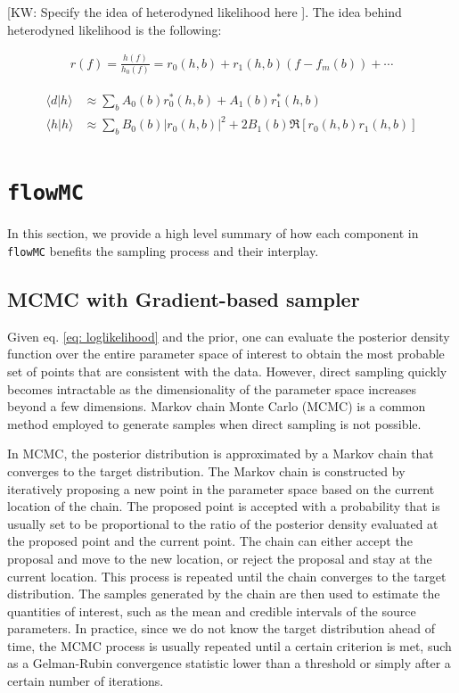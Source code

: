 \documentclass[twocolumn]{aastex631}
\newcommand{\kw}[1]{{\color{rb4}[KW: #1 ]}}
\begin{document}
\kw{Specify the idea of heterodyned likelihood here}.
The idea behind heterodyned likelihood is the following:


\begin{align}
r(f) = \frac{h(f)}{h_0(f)} = r_0(h,b) + r_1(h,b)(f- f_m(b)) + \cdots
\end{align}

\begin{align}
    \langle d|h \rangle &\approx \sum_b A_0(b) r^*_0(h,b) + A_1(b) r^*_1(h,b) \nonumber \\
    \langle h|h \rangle &\approx \sum_b B_0(b) |r_0(h,b)|^2 + 2 B_1(b) \Re[r_0(h,b)r_1(h,b)]
\end{align}


\section{\texttt{flowMC}}
\label{sec: flowMC}

In this section, we provide a high level summary of how each component in
\texttt{flowMC} benefits the sampling process and their interplay.

\subsection{MCMC with Gradient-based sampler}
\label{sec:gradient}

Given eq. \ref{eq: loglikelihood} and the prior, one can evaluate the posterior
density function over the entire parameter space of interest to obtain the most
probable set of points that are consistent with the data. However, direct
sampling quickly becomes intractable as the dimensionality of the parameter
space increases beyond a few dimensions. Markov chain Monte Carlo (MCMC) is a
common method employed to generate samples when direct sampling is not possible.

In MCMC, the posterior distribution is approximated by a Markov chain that
converges to the target distribution. The Markov chain is constructed by
iteratively proposing a new point in the parameter space based on the current
location of the chain. The proposed point is accepted with a probability that is
usually set to be proportional to the ratio of the posterior density evaluated
at the proposed point and the current point. The chain can either accept the
proposal and move to the new location, or reject the proposal and stay at the
current location. This process is repeated until the chain converges to the
target distribution. The samples generated by the chain are then used to
estimate the quantities of interest, such as the mean and credible intervals of
the source parameters. In practice, since we do not know the target distribution
ahead of time, the MCMC process is usually repeated until a certain criterion is
met, such as a Gelman-Rubin convergence statistic \cite{Gelman-rhat} lower than
a threshold or simply after a certain number of iterations.
\end{document}
